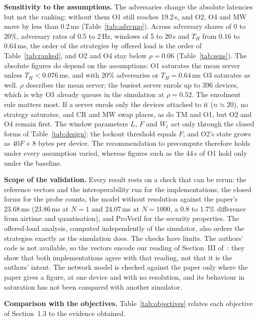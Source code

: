 \textbf{Sensitivity to the assumptions.} The adversaries change the absolute latencies but not the ranking: without them O1 still reaches 19.2\,s, and O2, O4 and MW move by less than 0.2\,ms (Table~\ref{tab:advcmp}). Across adversary shares of 0 to 20\%, adversary rates of 0.5 to 2\,Hz, windows of 5 to 20\,s and $T_H$ from 0.16 to 0.64\,ms, the order of the strategies by offered load is the order of Table~\ref{tab:ranked}, and O2 and O4 stay below $\rho=0.06$ (Table~\ref{tab:sens}). The absolute figures do depend on the assumptions: O1 saturates the mean server unless $T_H<0.076$\,ms, and with 20\% adversaries or $T_H=0.64$\,ms O3 saturates as well. $\rho$ describes the mean server; the busiest server enrols up to 396 devices, which is why O3 already queues in the simulation at $\rho=0.52$. The enrolment rule matters most. If a server enrols only the devices attached to it ($n\approx20$), no strategy saturates, and CR and MW swap places, as do TM and O1, but O2 and O4 remain first. The window parameters $L$, $F$ and $W_t$ act only through the closed forms of Table~\ref{tab:design}: the lockout threshold equals $F$, and O2's state grows as $40F+8$ bytes per device. The recommendation to precompute therefore holds under every assumption varied, whereas figures such as the 44\,s of O1 hold only under the baseline.

\textbf{Scope of the validation.} Every result rests on a check that can be rerun: the reference vectors and the interoperability run for the implementations, the closed forms for the probe counts, the model without resolution against the paper's 23.68\,ms (23.86\,ms at $N=1$ and 24.07\,ms at $N=1000$, a 0.8 to 1.7\% difference from airtime and quantisation), and ProVerif for the security properties. The offered-load analysis, computed independently of the simulator, also orders the strategies exactly as the simulation does. The checks have limits. The authors' code is not available, so the vectors encode our reading of Section~III of~\cite{base}: they show that both implementations agree with that reading, not that it is the authors' intent. The network model is checked against the paper only where the paper gives a figure, at one device and with no resolution, and its behaviour in saturation has not been compared with another simulator.

\textbf{Comparison with the objectives.} Table~\ref{tab:objectives} relates each objective of Section~1.3 to the evidence obtained.

